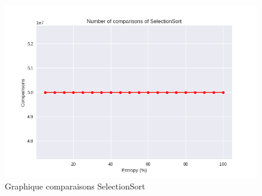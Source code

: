 \documentclass[10pt,a4paper]{article}
\begin{document}
            \begin{figure}
                \centering
                \includegraphics[width=1\textwidth]{graphique/SelectionSort/GraphComparisonsSelectionSort.png}
                \caption{Graphique comparaisons SelectionSort}
                \label{fig:mesh1}
            \end{figure}
\end{document}
